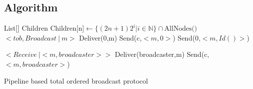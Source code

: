 \documentclass[a4paper]{article}
\begin{document}
        \subsection{Algorithm}
        \begin{algorithm}[H]
            \centering
            \begin{algorithmic}[5]
                \Data
		\State List[] Children
                \EndData
                \Init
		\State Children[n]$\gets\{(2n + 1)2^i | i \in \mathbb{N}\} \cap \text{AllNodes()}$
		\EndFor
                \EndInit
                \Event $< tob,Broadcast\ |\ m> $
                \State Deliver(0,m)
                \State Send(c,$<m,0>$)
		\EndFor
		\Else
		\State Send(0,$<m,Id()>$)
	        \EndIf
                \EndEvent

                \Event $<Receive\ | <m,broadcaster>>$
                \State Deliver(broadcaster,m)
                \State Send(c,$<m,broadcaster>$)
		\EndFor
                \EndEvent
            \end{algorithmic}
            \caption{Pipeline based total ordered broadcast protocol}
        \end{algorithm}
\end{document}
